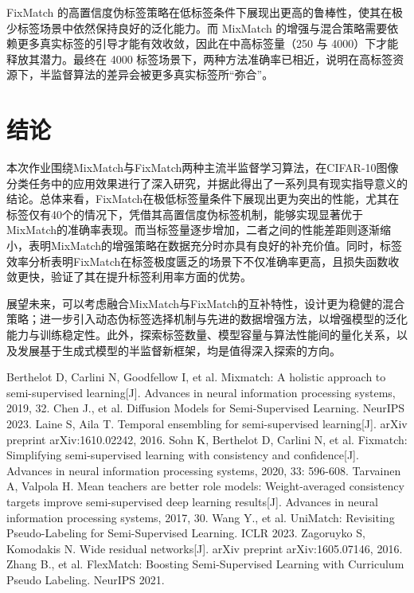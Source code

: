 \documentclass[a4paper, utf8]{ctexart}
\begin{document}
	FixMatch 的高置信度伪标签策略在低标签条件下展现出更高的鲁棒性，使其在极少标签场景中依然保持良好的泛化能力。而 MixMatch 的增强与混合策略需要依赖更多真实标签的引导才能有效收敛，因此在中高标签量（250 与 4000）下才能释放其潜力。最终在 4000 标签场景下，两种方法准确率已相近，说明在高标签资源下，半监督算法的差异会被更多真实标签所“弥合”。
	
	\section{结论}
	
	本次作业围绕MixMatch与FixMatch两种主流半监督学习算法，在CIFAR-10图像分类任务中的应用效果进行了深入研究，并据此得出了一系列具有现实指导意义的结论。总体来看，FixMatch在极低标签量条件下展现出更为突出的性能，尤其在标签仅有40个的情况下，凭借其高置信度伪标签机制，能够实现显著优于MixMatch的准确率表现。而当标签量逐步增加，二者之间的性能差距则逐渐缩小，表明MixMatch的增强策略在数据充分时亦具有良好的补充价值。同时，标签效率分析表明FixMatch在标签极度匮乏的场景下不仅准确率更高，且损失函数收敛更快，验证了其在提升标签利用率方面的优势。
	
	展望未来，可以考虑融合MixMatch与FixMatch的互补特性，设计更为稳健的混合策略；进一步引入动态伪标签选择机制与先进的数据增强方法，以增强模型的泛化能力与训练稳定性。此外，探索标签数量、模型容量与算法性能间的量化关系，以及发展基于生成式模型的半监督新框架，均是值得深入探索的方向。
	
	\let\cleardoublepage\clearpage
	
	\begin{thebibliography}{99}
		 Berthelot D, Carlini N, Goodfellow I, et al. Mixmatch: A holistic approach to semi-supervised learning[J]. Advances in neural information processing systems, 2019, 32.
		 Chen J., et al. Diffusion Models for Semi-Supervised Learning. NeurIPS 2023.
		 Laine S, Aila T. Temporal ensembling for semi-supervised learning[J]. arXiv preprint arXiv:1610.02242, 2016.
		 Sohn K, Berthelot D, Carlini N, et al. Fixmatch: Simplifying semi-supervised learning with consistency and confidence[J]. Advances in neural information processing systems, 2020, 33: 596-608.
		 Tarvainen A, Valpola H. Mean teachers are better role models: Weight-averaged consistency targets improve semi-supervised deep learning results[J]. Advances in neural information processing systems, 2017, 30.
		 Wang Y., et al. UniMatch: Revisiting Pseudo-Labeling for Semi-Supervised Learning. ICLR 2023.
		 Zagoruyko S, Komodakis N. Wide residual networks[J]. arXiv preprint arXiv:1605.07146, 2016.
		 Zhang B., et al. FlexMatch: Boosting Semi-Supervised Learning with Curriculum Pseudo Labeling. NeurIPS 2021.
	\end{thebibliography}
	
\end{document}
